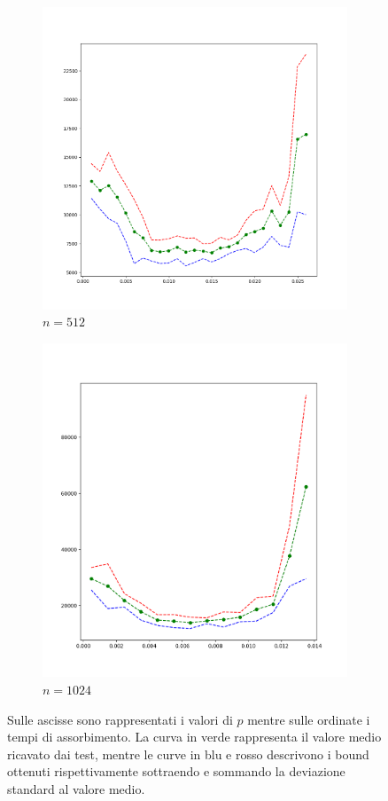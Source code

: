 \documentclass[../Tesi.tex]{subfiles}
\begin{document}
\begin{figure}[H]
\centering
    \begin{subfigure}[b]{0.45\textwidth}
      \centering
      \includegraphics[width=0.8\linewidth]{imgs/ER_p_variation/n=512 a=025.png}
      \caption*{$n=512$}
      \label{fig:sub1}
    \end{subfigure}%
    \begin{subfigure}[b]{0.45\textwidth}
      \centering
      \includegraphics[width=0.8\linewidth]{imgs/ER_p_variation/n=1024 a=025.png}
      \caption*{$n=1024$}
      \label{fig:sub2}
    \end{subfigure}
\caption*{Sulle ascisse sono rappresentati i valori di $p$ mentre sulle ordinate i tempi di assorbimento. La curva in verde rappresenta il valore medio ricavato dai test, mentre le curve in blu e rosso descrivono i bound ottenuti rispettivamente sottraendo e sommando la deviazione standard al valore medio.}
\end{figure}
\end{document}
